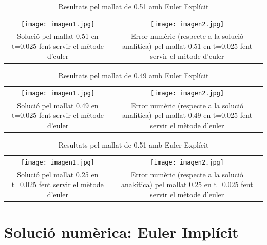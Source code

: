 \documentclass{article}
\begin{document}
\begin{table}[h]
    \centering
    \caption{Resultats pel mallat de 0.51 amb Euler Explícit}
    \label{tab:euler_at1}
    \begin{tabular}{cc}
        \texttt{[image: imagen1.jpg]} &
        \texttt{[image: imagen2.jpg]} \\
        
        \parbox{0.4\textwidth}{\centering Solució pel mallat 0.51 en t=0.025 fent servir el mètode d'euler} &
        \parbox{0.4\textwidth}{\centering Error numèric (respecte a la solució analítica) pel mallat 0.51 en t=0.025 fent servir el mètode d'euler} \\
 
    \end{tabular}
\end{table}
\begin{table}[h]
    \centering
    \caption{Resultats pel mallat de 0.49 amb Euler Explícit}
    \label{tab:euler_at1}
    \begin{tabular}{cc}
        \texttt{[image: imagen1.jpg]} &
        \texttt{[image: imagen2.jpg]} \\
        
        \parbox{0.4\textwidth}{\centering Solució pel mallat 0.49 en t=0.025 fent servir el mètode d'euler} &
        \parbox{0.4\textwidth}{\centering Error numèric (respecte a la solució analítica) pel mallat 0.49 en t=0.025 fent servir el mètode d'euler} \\
 
    \end{tabular}
\end{table}
\begin{table}[h]
    \centering
    \caption{Resultats pel mallat de 0.51 amb Euler Explícit}
    \label{tab:euler_at1}
    \begin{tabular}{cc}
        \texttt{[image: imagen1.jpg]} &
        \texttt{[image: imagen2.jpg]} \\
        
        \parbox{0.4\textwidth}{\centering Solució pel mallat 0.25 en t=0.025 fent servir el mètode d'euler} &
        \parbox{0.4\textwidth}{\centering Error numèric (respecte a la solució anakítica) pel mallat 0.25 en t=0.025 fent servir el mètode d'euler} \\
 
    \end{tabular}
\end{table}

\section{Solució numèrica: Euler Implícit}
\end{document}

